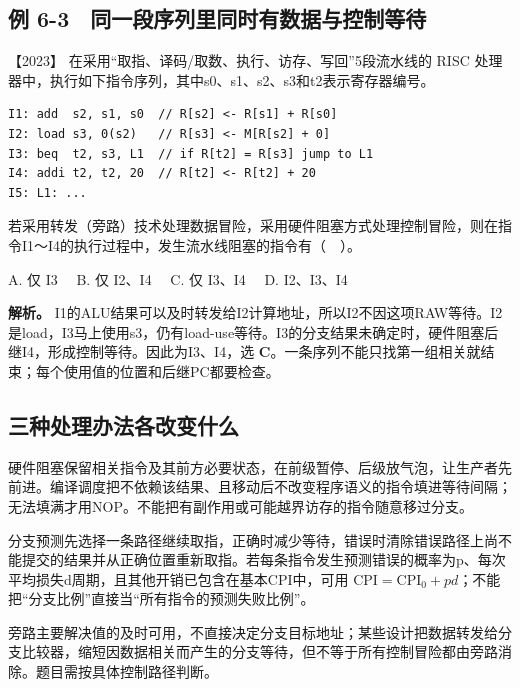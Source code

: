 \subsection{例 6-3　同一段序列里同时有数据与控制等待}\label{co-ex6-3}

\noindent{}【2023】 在采用``取指、译码/取数、执行、访存、写回''5段流水线的 RISC 处理器中，执行如下指令序列，其中s0、s1、s2、s3和t2表示寄存器编号。

\par\medskip\noindent
\begin{minipage}{\linewidth}
\begin{verbatim}
I1: add  s2, s1, s0  // R[s2] <- R[s1] + R[s0]
I2: load s3, 0(s2)   // R[s3] <- M[R[s2] + 0]
I3: beq  t2, s3, L1  // if R[t2] = R[s3] jump to L1
I4: addi t2, t2, 20  // R[t2] <- R[t2] + 20
I5: L1: ...
\end{verbatim}
\end{minipage}\par\medskip

若采用转发（旁路）技术处理数据冒险，采用硬件阻塞方式处理控制冒险，则在指令I1～I4的执行过程中，发生流水线阻塞的指令有（　）。

A. 仅 I3　 B. 仅 I2、I4　 C. 仅 I3、I4　 D. I2、I3、I4


\textbf{解析。} I1的ALU结果可以及时转发给I2计算地址，所以I2不因这项RAW等待。I2是load，I3马上使用s3，仍有load-use等待。I3的分支结果未确定时，硬件阻塞后继I4，形成控制等待。因此为I3、I4，选 \textbf{C}。一条序列不能只找第一组相关就结束；每个使用值的位置和后继PC都要检查。

\subsection{三种处理办法各改变什么}\label{co-c06-h102}

硬件阻塞保留相关指令及其前方必要状态，在前级暂停、后级放气泡，让生产者先前进。编译调度把不依赖该结果、且移动后不改变程序语义的指令填进等待间隔；无法填满才用NOP。不能把有副作用或可能越界访存的指令随意移过分支。

分支预测先选择一条路径继续取指，正确时减少等待，错误时清除错误路径上尚不能提交的结果并从正确位置重新取指。若每条指令发生预测错误的概率为p、每次平均损失d周期，且其他开销已包含在基本CPI中，可用 \(\mathrm{CPI}=\mathrm{CPI}_{0}+pd\)；不能把``分支比例''直接当``所有指令的预测失败比例''。

旁路主要解决值的及时可用，不直接决定分支目标地址；某些设计把数据转发给分支比较器，缩短因数据相关而产生的分支等待，但不等于所有控制冒险都由旁路消除。题目需按具体控制路径判断。

